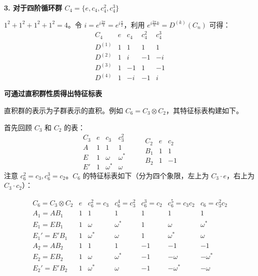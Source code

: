 \begin{example}
    \textbf{3. 对于四阶循环群 $C_4 = \{e, c_4, c_4^2, c_4^3\}$}
    
    $1^2 + 1^2 + 1^2 + 1^2 = 4$。令 $i = e^{i \frac{2\pi}{4}} = e^{i \frac{\pi}{2}}$，利用 $e^{i \frac{2\pi}{n}k} = D^{(k)}(C_n)$ 可得：
    \begin{equation}
        \begin{array}{c|cccc}
            C_4 & e & c_4 & c_4^2 & c_4^3 \\
            \hline
            D^{(1)} & 1 & 1 & 1 & 1 \\
            D^{(2)} & 1 & i & -1 & -i \\
            D^{(3)} & 1 & -1 & 1 & -1 \\
            D^{(4)} & 1 & -i & -1 & i
        \end{array}
    \end{equation}
    
    \textbf{可通过直积群性质得出特征标表}
    
    直积群的表示为子群表示的直积。例如 $C_6 = C_3 \otimes C_2$，其特征标表构建如下。
    
    首先回顾 $C_3$ 和 $C_2$ 的表：
    \begin{equation}
        \begin{array}{c|ccc}
             C_3 & e & c_3 & c_3^2 \\
             \hline
             A & 1 & 1 & 1 \\
             E & 1 & \omega & \omega^* \\
             E' & 1 & \omega^* & \omega
        \end{array}
        \qquad
        \begin{array}{c|cc}
             C_2 & e & c_2 \\
             \hline
             B_1 & 1 & 1 \\
             B_2 & 1 & -1
        \end{array}
    \end{equation}
    注意 $c_6^2 = c_3, c_6^3 = c_2$。$C_6$ 的特征标表如下（分为四个象限，左上为 $C_3 \cdot e$，右上为 $C_3 \cdot c_2$）：
    
    \begin{equation}
        \begin{array}{c|ccc|ccc}
            C_6 = C_3 \otimes C_2 & e & c_6^2=c_3 & c_6^4=c_3^2 & c_6^3=c_2 & c_6^5=c_3c_2 & c_6=c_3^2c_2 \\
            \hline
            A_1 = AB_1 & 1 & 1 & 1 & 1 & 1 & 1 \\
            E_1 = EB_1 & 1 & \omega & \omega^* & 1 & \omega & \omega^* \\
            E_1' = E'B_1 & 1 & \omega^* & \omega & 1 & \omega^* & \omega \\
            \hline
            A_2 = AB_2 & 1 & 1 & 1 & -1 & -1 & -1 \\
            E_2 = EB_2 & 1 & \omega & \omega^* & -1 & -\omega & -\omega^* \\
            E_2' = E'B_2 & 1 & \omega^* & \omega & -1 & -\omega^* & -\omega
        \end{array}
    \end{equation}
    

\end{example}
